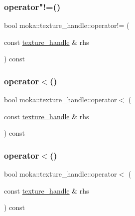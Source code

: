 \mbox{\label{structmoka_1_1texture__handle_aac5e6455e729c16683add7bff4931165}} 
\subsubsection{\texorpdfstring{operator"!=()}{operator!=()}\hspace{0.1cm}{\footnotesize\ttfamily [2/2]}}
{\footnotesize\ttfamily bool moka\+::texture\+\_\+handle\+::operator!= (\begin{DoxyParamCaption}\item[{const \mbox{\hyperlink{structmoka_1_1texture__handle}{texture\+\_\+handle}} \&}]{rhs }\end{DoxyParamCaption}) const}

\mbox{\label{structmoka_1_1texture__handle_a95f0ca42db2cbb2f41f0b8ec2ec44863}} 
\subsubsection{\texorpdfstring{operator$<$()}{operator<()}\hspace{0.1cm}{\footnotesize\ttfamily [1/2]}}
{\footnotesize\ttfamily bool moka\+::texture\+\_\+handle\+::operator$<$ (\begin{DoxyParamCaption}\item[{const \mbox{\hyperlink{structmoka_1_1texture__handle}{texture\+\_\+handle}} \&}]{rhs }\end{DoxyParamCaption}) const}

\mbox{\label{structmoka_1_1texture__handle_a95f0ca42db2cbb2f41f0b8ec2ec44863}} 
\subsubsection{\texorpdfstring{operator$<$()}{operator<()}\hspace{0.1cm}{\footnotesize\ttfamily [2/2]}}
{\footnotesize\ttfamily bool moka\+::texture\+\_\+handle\+::operator$<$ (\begin{DoxyParamCaption}\item[{const \mbox{\hyperlink{structmoka_1_1texture__handle}{texture\+\_\+handle}} \&}]{rhs }\end{DoxyParamCaption}) const}

